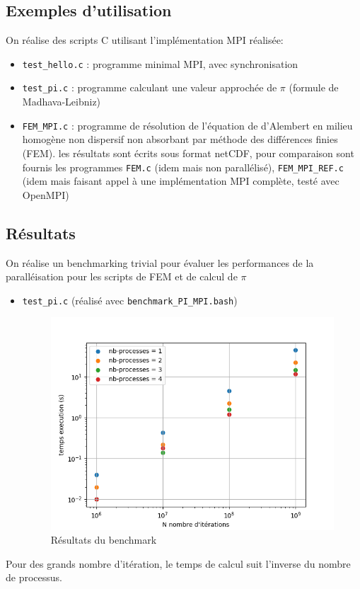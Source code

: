\documentclass[a4paper]{article}
\begin{document}
\subsection{Exemples d'utilisation}

On réalise des scripts C utilisant l'implémentation MPI réalisée:
\begin{itemize}
    \item \verb|test_hello.c| : programme minimal MPI, avec synchronisation
    \item \verb|test_pi.c| : programme calculant une valeur approchée de $\pi$ (formule de Madhava-Leibniz)
    \item \verb|FEM_MPI.c| :  programme de résolution de l'équation de d'Alembert en milieu homogène non dispersif non absorbant par méthode des différences finies (FEM). les résultats sont écrits sous format netCDF, pour comparaison sont fournis les programmes \verb|FEM.c| (idem mais non parallélisé), \verb|FEM_MPI_REF.c| (idem mais faisant appel à une implémentation MPI complète, testé avec OpenMPI)
\end{itemize}

\subsection{Résultats}

On réalise un benchmarking trivial pour évaluer les performances de la paralléisation pour les scripts de FEM et de calcul de $\pi$

\begin{itemize}
    \item \verb|test_pi.c| (réalisé avec \verb|benchmark_PI_MPI.bash|)
    \begin{figure}[!ht]
        \centering
        \includegraphics[width=0.5\linewidth]{../MPI_Kahn_C/test/data-benchmark/plot_pi_benchmark.png}
        \caption{Résultats du benchmark}

    \end{figure}
\end{itemize}

Pour des grands nombre d'itération, le temps de calcul suit l'inverse du nombre de processus.
\end{document}

